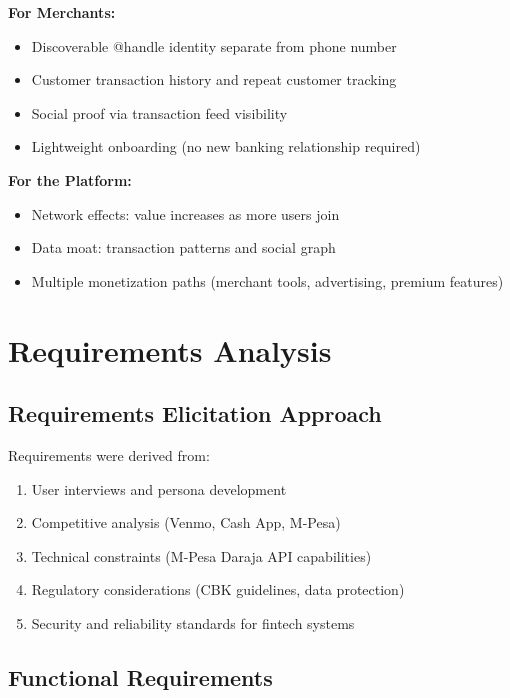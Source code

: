 \documentclass[12pt, a4paper, twoside, openright]{report}
\begin{document}
\textbf{For Merchants:}
\begin{itemize}
    \item Discoverable @handle identity separate from phone number
    \item Customer transaction history and repeat customer tracking
    \item Social proof via transaction feed visibility
    \item Lightweight onboarding (no new banking relationship required)
\end{itemize}

\textbf{For the Platform:}
\begin{itemize}
    \item Network effects: value increases as more users join
    \item Data moat: transaction patterns and social graph
    \item Multiple monetization paths (merchant tools, advertising, premium features)
\end{itemize}


\chapter{Requirements Analysis}

\section{Requirements Elicitation Approach}

Requirements were derived from:

\begin{enumerate}
    \item User interviews and persona development
    \item Competitive analysis (Venmo, Cash App, M-Pesa)
    \item Technical constraints (M-Pesa Daraja API capabilities)
    \item Regulatory considerations (CBK guidelines, data protection)
    \item Security and reliability standards for fintech systems
\end{enumerate}

\section{Functional Requirements}
\end{document}
